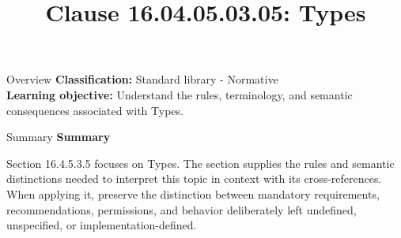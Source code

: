 \documentclass[10pt,letterpaper]{article}
\title{Clause 16.04.05.03.05: Types}
\author{}
\date{}
\begin{document}
\maketitle
\begin{CornellOverviewBox}{Overview}
\textbf{Classification:} Standard library - Normative\\[2pt]
\textbf{Learning objective:} Understand the rules, terminology, and semantic consequences associated with Types.
\end{CornellOverviewBox}\begin{CornellSummaryBox}{Summary}
{\sffamily\bfseries\color{Accent} Summary}\par\vspace{3pt}Section 16.4.5.3.5 focuses on Types. The section supplies the rules and semantic distinctions needed to interpret this topic in context with its cross-references. When applying it, preserve the distinction between mandatory requirements, recommendations, permissions, and behavior deliberately left undefined, unspecified, or implementation-defined.
\end{CornellSummaryBox}
\end{document}
